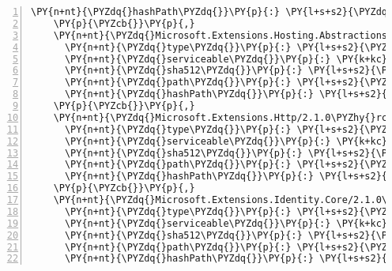\begin{Verbatim}[commandchars=\\\{\},numbers=left,firstnumber=1,stepnumber=1,numberblanklines=0]
      \PY{n+nt}{\PYZdq{}hashPath\PYZdq{}}\PY{p}{:} \PY{l+s+s2}{\PYZdq{}microsoft.extensions.hosting.2.1.0\PYZhy{}rc1\PYZhy{}final.nupkg.sha512\PYZdq{}}
    \PY{p}{\PYZcb{}}\PY{p}{,}
    \PY{n+nt}{\PYZdq{}Microsoft.Extensions.Hosting.Abstractions/2.1.0\PYZhy{}rc1\PYZhy{}final\PYZdq{}}\PY{p}{:} \PY{p}{\PYZob{}}
      \PY{n+nt}{\PYZdq{}type\PYZdq{}}\PY{p}{:} \PY{l+s+s2}{\PYZdq{}package\PYZdq{}}\PY{p}{,}
      \PY{n+nt}{\PYZdq{}serviceable\PYZdq{}}\PY{p}{:} \PY{k+kc}{true}\PY{p}{,}
      \PY{n+nt}{\PYZdq{}sha512\PYZdq{}}\PY{p}{:} \PY{l+s+s2}{\PYZdq{}sha512\PYZhy{}kYER3+645f+IOyACUNrTcuSdLY8ugcsMT6SktaZUfxo4r2ORiWq0zSD8Igx78ErJPm1p1f7FrJvmrnOxnVolJA==\PYZdq{}}\PY{p}{,}
      \PY{n+nt}{\PYZdq{}path\PYZdq{}}\PY{p}{:} \PY{l+s+s2}{\PYZdq{}microsoft.extensions.hosting.abstractions/2.1.0\PYZhy{}rc1\PYZhy{}final\PYZdq{}}\PY{p}{,}
      \PY{n+nt}{\PYZdq{}hashPath\PYZdq{}}\PY{p}{:} \PY{l+s+s2}{\PYZdq{}microsoft.extensions.hosting.abstractions.2.1.0\PYZhy{}rc1\PYZhy{}final.nupkg.sha512\PYZdq{}}
    \PY{p}{\PYZcb{}}\PY{p}{,}
    \PY{n+nt}{\PYZdq{}Microsoft.Extensions.Http/2.1.0\PYZhy{}rc1\PYZhy{}final\PYZdq{}}\PY{p}{:} \PY{p}{\PYZob{}}
      \PY{n+nt}{\PYZdq{}type\PYZdq{}}\PY{p}{:} \PY{l+s+s2}{\PYZdq{}package\PYZdq{}}\PY{p}{,}
      \PY{n+nt}{\PYZdq{}serviceable\PYZdq{}}\PY{p}{:} \PY{k+kc}{true}\PY{p}{,}
      \PY{n+nt}{\PYZdq{}sha512\PYZdq{}}\PY{p}{:} \PY{l+s+s2}{\PYZdq{}sha512\PYZhy{}Le1b7S6s/kTYFjAiPS4xafcxkmY1L1WvBn4qLo7gc/34855MEDHAoIkOR9Li/g76xl/hZzJp2U3jwjnhhBVsXw==\PYZdq{}}\PY{p}{,}
      \PY{n+nt}{\PYZdq{}path\PYZdq{}}\PY{p}{:} \PY{l+s+s2}{\PYZdq{}microsoft.extensions.http/2.1.0\PYZhy{}rc1\PYZhy{}final\PYZdq{}}\PY{p}{,}
      \PY{n+nt}{\PYZdq{}hashPath\PYZdq{}}\PY{p}{:} \PY{l+s+s2}{\PYZdq{}microsoft.extensions.http.2.1.0\PYZhy{}rc1\PYZhy{}final.nupkg.sha512\PYZdq{}}
    \PY{p}{\PYZcb{}}\PY{p}{,}
    \PY{n+nt}{\PYZdq{}Microsoft.Extensions.Identity.Core/2.1.0\PYZhy{}rc1\PYZhy{}final\PYZdq{}}\PY{p}{:} \PY{p}{\PYZob{}}
      \PY{n+nt}{\PYZdq{}type\PYZdq{}}\PY{p}{:} \PY{l+s+s2}{\PYZdq{}package\PYZdq{}}\PY{p}{,}
      \PY{n+nt}{\PYZdq{}serviceable\PYZdq{}}\PY{p}{:} \PY{k+kc}{true}\PY{p}{,}
      \PY{n+nt}{\PYZdq{}sha512\PYZdq{}}\PY{p}{:} \PY{l+s+s2}{\PYZdq{}sha512\PYZhy{}C2x41eHRF4chDukmwEIvOEB4DHLeO1d70W2S+jY5TON2gv2OpEV40ObgLg7wtq9bRADODPtJZ7kDKiadFEXMNg==\PYZdq{}}\PY{p}{,}
      \PY{n+nt}{\PYZdq{}path\PYZdq{}}\PY{p}{:} \PY{l+s+s2}{\PYZdq{}microsoft.extensions.identity.core/2.1.0\PYZhy{}rc1\PYZhy{}final\PYZdq{}}\PY{p}{,}
      \PY{n+nt}{\PYZdq{}hashPath\PYZdq{}}\PY{p}{:} \PY{l+s+s2}{\PYZdq{}microsoft.extensions.identity.core.2.1.0\PYZhy{}rc1\PYZhy{}final.nupkg.sha512\PYZdq{}}

\end{Verbatim}
